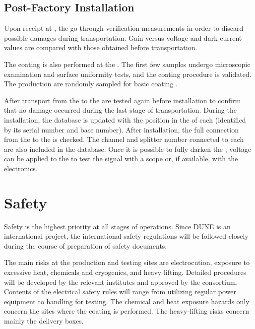  \subsection{Post-Factory Installation}
 \label{sec:fddp-pd-10.2}
 
Upon receipt at , the  go through verification measurements in order to discard possible damages during transportation. 
  Gain versus voltage and dark current values are compared with those obtained before transportation.

The  coating is also performed at the . The first few samples undergo microscopic examination and surface uniformity tests, and the coating procedure is validated. The production  are randomly sampled for basic coating .

After  transport from the  to \surf the  are tested again before installation to confirm that no damage occurred during the last stage of transportation. During the installation, the  database is updated with the position in the  of each  (identified by its serial number and base number). After installation, the full connection from the  to the  is checked. The  channel and splitter number connected to each  are also included in the  database. %
Once it is possible to fully darken the , voltage can be applied to the  to test the signal with a scope or, if available, with the  electronics.

\section{Safety}
\label{sec:fddp-pd-11}

Safety is the highest priority at all stages of \dual {} operations. Since DUNE is an international project, the international safety regulations will be followed closely during the course of preparation of safety documents.

The main risks at the production and testing sites are electrocution, exposure to excessive heat, chemicals and cryogenics, and heavy lifting. Detailed procedures will be developed by the relevant institutes and approved by the \dual {} consortium. Contents of the electrical safety rules will range from utilizing regular power equipment to handling  for testing. The chemical and heat exposure hazards only concern the sites where the  coating is performed. The heavy-lifting risks concern mainly %
the  delivery boxes.

